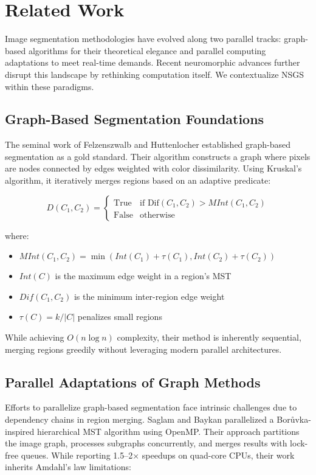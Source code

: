 \documentclass[conference]{IEEEtran}
\begin{document}
\section{Related Work} \label{sec:related_work}
Image segmentation methodologies have evolved along two parallel tracks: graph-based algorithms for their theoretical elegance and parallel computing adaptations to meet real-time demands. Recent neuromorphic advances further disrupt this landscape by rethinking computation itself. We contextualize NSGS within these paradigms.

\subsection{Graph-Based Segmentation Foundations}
The seminal work of Felzenszwalb and Huttenlocher \cite{Felzenszwalb2004} established graph-based segmentation as a gold standard. Their algorithm constructs a graph where pixels are nodes connected by edges weighted with color dissimilarity. Using Kruskal's algorithm, it iteratively merges regions based on an adaptive predicate:

\begin{equation}
D(C_1, C_2) = 
\begin{cases}
\text{True} & \text{if } \text{Dif}(C_1, C_2) > MInt(C_1, C_2) \\
\text{False} & \text{otherwise}
\end{cases}
\end{equation}

where:
\begin{itemize}
    \item $MInt(C_1, C_2) = \min(Int(C_1) + \tau(C_1), Int(C_2) + \tau(C_2))$
    \item $Int(C)$ is the maximum edge weight in a region's MST
    \item $Dif(C_1, C_2)$ is the minimum inter-region edge weight
    \item $\tau(C) = k/|C|$ penalizes small regions
\end{itemize}

While achieving $O(n\log n)$ complexity, their method is inherently sequential, merging regions greedily without leveraging modern parallel architectures.

\subsection{Parallel Adaptations of Graph Methods}
Efforts to parallelize graph-based segmentation face intrinsic challenges due to dependency chains in region merging. Saglam and Baykan \cite{Saglam2016} parallelized a Borůvka-inspired hierarchical MST algorithm using OpenMP. Their approach partitions the image graph, processes subgraphs concurrently, and merges results with lock-free queues. While reporting 1.5–2× speedups on quad-core CPUs, their work inherits Amdahl's law limitations:
\end{document}
